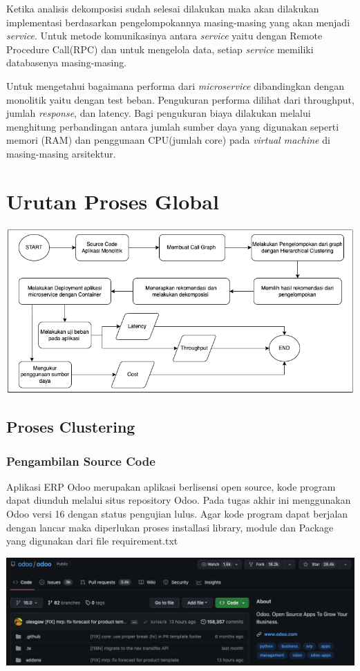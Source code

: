 Ketika analisis dekomposisi sudah selesai dilakukan maka akan dilakukan implementasi berdasarkan pengelompokannya masing-masing yang akan menjadi \textit{service}. Untuk metode komunikasinya antara \textit{service} yaitu dengan Remote Procedure Call(RPC) dan untuk mengelola data, setiap \textit{service} memiliki databasenya masing-masing.

Untuk mengetahui bagaimana performa dari \textit{microservice} dibandingkan dengan monolitik yaitu dengan test beban. Pengukuran performa dilihat dari throughput, jumlah \textit{response}, dan latency. Bagi pengukuran biaya dilakukan melalui menghitung perbandingan antara jumlah sumber daya yang digunakan seperti memori (RAM) dan penggunaan CPU(jumlah core) pada \textit{virtual machine} di masing-masing arsitektur.

\section{Urutan Proses Global}
\begin{center}
	\includegraphics[width=14cm]{img/FlowchartProsesGlobal.png}
	\label{fig:asd}
\end{center}

\subsection{Proses Clustering}

\subsubsection{Pengambilan Source Code}
Aplikasi ERP Odoo merupakan aplikasi berlisensi open source, kode program dapat diunduh melalui situs repository Odoo. Pada tugas akhir ini menggunakan Odoo versi 16 dengan status pengujian lulus. Agar kode program dapat berjalan dengan lancar maka diperlukan proses installasi library, module dan Package yang digunakan dari file requirement.txt
\begin{center}
	\includegraphics[width=14cm]{img/bab_3/github.png}
	\label{fig:asd}
\end{center}
